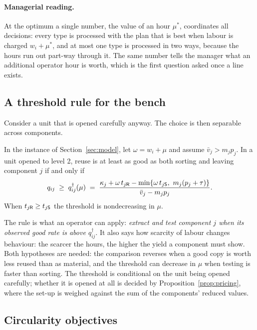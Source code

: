 \paragraph{Managerial reading.} At the optimum a single number, the value of an hour $\mu^\ast$, coordinates all
decisions: every type is processed with the plan that is best when labour is charged $w_i+\mu^\ast$, and at most
one type is processed in two ways, because the hours run out part-way through it. The same number tells the manager
what an additional operator hour is worth, which is the first question asked once a line exists.

\subsection{A threshold rule for the bench}

Consider a unit that is opened carefully anyway. The choice is then separable across components.

\begin{proposition}\label{prop:threshold}
In the instance of Section~\ref{sec:model}, let $\omega=w_i+\mu$ and assume $\bar v_j>m_jp_j$. In a unit opened to
level 2, reuse is at least as good as both sorting and leaving component $j$ if and only if
\begin{equation}\label{eq:threshold}
q_{ij}\;\ge\;q^{\dagger}_{ij}(\mu)\;=\;\frac{\kappa_j+\omega\,t_{j\R}-\min\{\omega\,t_{j\Sd},\ m_j(p_j+\tau)\}}
{\bar v_j-m_jp_j}.
\end{equation}
When $t_{j\mathsf{R}}\ge t_{j\mathsf{S}}$ the threshold is nondecreasing in $\mu$.
\end{proposition}

The rule is what an operator can apply: \emph{extract and test component $j$ when its observed good rate is above
$q^\dagger_{ij}$}. It also says how scarcity of labour changes behaviour: the scarcer the hours, the higher the
yield a component must show. Both hypotheses are needed: the comparison reverses when a good copy is worth less
reused than as material, and the threshold can decrease in $\mu$ when testing is faster than sorting. The threshold
is conditional on the unit being opened carefully; whether it is opened at all is decided by
Proposition~\ref{prop:pricing}, where the set-up is weighed against the sum of the components' reduced values.

\subsection{Circularity objectives}

